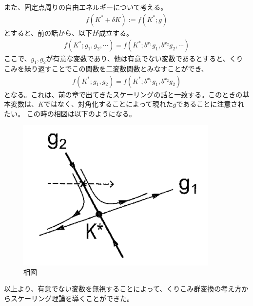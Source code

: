 \documentclass[a4paper,11pt]{jsarticle}
\numberwithin{equation}{section}
\begin{document}
また、固定点周りの自由エネルギーについて考える。
\begin{align}
    f(K^* + \delta K) := f(K^*;g)
\end{align}
とすると、前の話から、以下が成立する。
\begin{align}
    f(K^*;g_1, g_2, \cdots) = f(K^*;b^{x_1}g_1, b^{x_2}g_2, \cdots)
\end{align}
ここで、$g_1,g_2$が有意な変数であり、他は有意でない変数であるとすると、くりこみを繰り返すことでこの関数を二変数関数とみなすことができ、
\begin{align}
    f(K^*;g_1, g_2) = f(K^*;b^{x_1}g_1, b^{x_2}g_2)
\end{align}
となる。これは、前の章で出てきたスケーリングの話と一致する。このときの基本変数は、$K$ではなく、対角化することによって現れた$g$であることに注意されたい。
この時の相図は以下のようになる。
\begin{figure}[H]
    \begin{center}
    \includegraphics[width=100mm]{g.png}
    \end{center}
    \caption{相図}
    \label{fig:three}
\end{figure}
以上より、有意でない変数を無視することによって、くりこみ群変換の考え方からスケーリング理論を導くことができた。
\end{document}
